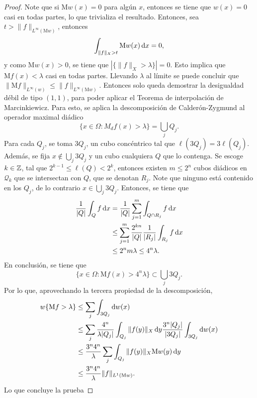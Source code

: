 \begin{proof}
	Note que si $\mathrm{M}w(x) = 0$ para algún $x$, entonces se tiene que $w(x)=0$ casi en todas partes, lo que trivializa el resultado. Entonces, sea $t > \|f\|_{L^\infty(\mathrm{M}w)}$, entonces 
	\begin{equation*}
		\int_{\|f\|_X > t} \mathrm{M}w(x) \mathop{}\!\mathrm{d} x = 0,
	\end{equation*}
	y como $\mathrm{M}w(x) > 0$, se tiene que $|\{\|f\|_X > \lambda\}| = 0$. Esto implica que $\mathrm{M}f(x) < \lambda$ casi en todas partes. Llevando $\lambda$ al límite se puede concluir que $\|\mathrm{M}f\|_{L^\infty(w)} \leq \|f\|_{L^\infty(\mathrm{M}w)}$. Entonces solo queda demostrar la desigualdad débil de tipo $(1,1)$, para poder aplicar el Teorema de interpolación de Marcinkiewicz. Para esto, se aplica la descomposición de Calderón-Zygmund al operador maximal diádico
	\begin{equation*}
		\{x\in\Omega:M_df(x)>\lambda\} = \bigcup_jQ_j.
	\end{equation*}
	Para cada $Q_j$, se toma $3Q_j$, un cubo concéntrico tal que $\ell(3Q_j) = 3\ell(Q_j)$. Además, se fija $x \notin \bigcup_j 3Q_j$ y un cubo cualquiera $Q$ que lo contenga. Se escoge $k\in\mathbb{Z}$, tal que $2^{k-1}\leq\ell(Q)<2^k$, entonces existen $m\leq 2^n$ cubos diádicos en $\mathcal{Q}_k$ que se intersectan con $Q$, que se denotan $R_j$. Note que ninguno está contenido en los $Q_j$, de lo contrario $x\in \bigcup_j 3Q_j$. Entonces, se tiene que 
	\begin{align*}
		\frac{1}{|Q|} \int_Q f \mathop{}\!\mathrm{d} x &= \frac{1}{|Q|}\sum_{j=1}^m \int_{Q\cap R_j} f \mathop{}\!\mathrm{d} x \\
		& \leq \sum_{j=1}^m \frac{2^{kn}}{|Q|}\frac{1}{|R_j|}\int_{R_j} f\mathop{}\!\mathrm{d} x \\
		& \leq 2^nm\lambda \leq 4^n\lambda.
	\end{align*}
	En conclusión, se tiene que 
	\begin{equation*}
		\{x\in\Omega:\mathrm{M}f(x)>4^n\lambda\} \subset \bigcup_j3Q_j.
	\end{equation*}
	Por lo que, aprovechando la tercera propiedad de la descomposición,
	\begin{align*}
		w\{\mathrm{M}f>\lambda\} & \leq \sum_j \int_{3Q_j} \mathop{}\!\mathrm{d} w(x)\\
		& \leq \sum_j \frac{4^n}{\lambda |Q_j|} \int_{Q_j} \|f(y)\|_X \mathop{}\!\mathrm{d} y\frac{3^n|Q_j|}{|3Q_j|}
		\int_{3Q_j} \mathop{}\!\mathrm{d} w(x) \\
		& \leq \frac{3^n4^n}{\lambda} \sum_j \int_{Q_j} \|f(y)\|_X \mathrm{M}w(y) \mathop{}\!\mathrm{d} y\\
		& \leq \frac{3^n4^n}{\lambda}  \|f\|_{L^1(\mathrm{M}w)}.
	\end{align*}
	Lo que concluye la prueba
\end{proof}
